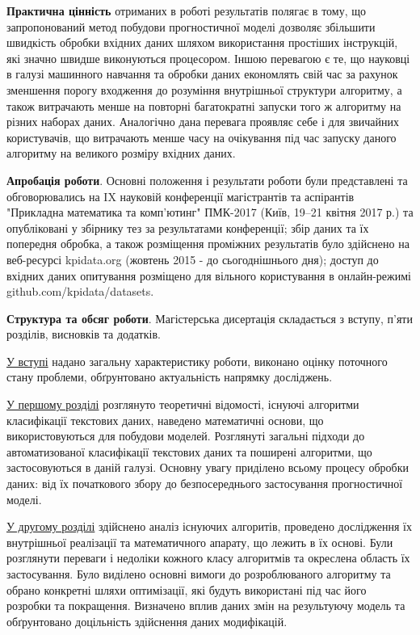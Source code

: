 \documentclass[a4paper,14pt]{extarticle}
\begin{document}
\textbf{Практична цінність} отриманих в роботі результатів полягає в тому,
що запропонований метод побудови прогностичної моделі дозволяє збільшити швидкість обробки вхідних даних шляхом використання простіших інструкцій, які значно швидше виконуються процесором. Іншою перевагою є те, що науковці в галузі машинного навчання та обробки даних економлять свій час за рахунок зменшення порогу входження до розуміння внутрішньої структури алгоритму, а також витрачають менше на повторні багатократні запуски того ж алгоритму на різних наборах даних. Аналогічно дана перевага проявляє себе і для звичайних користувачів, що витрачають менше часу на очікування під час запуску даного алгоритму на великого розміру вхідних даних.

\textbf{Апробація роботи}. Основні положення і результати роботи були представлені та обговорювались на IX науковій конференції магістрантів та аспірантів "Прикладна математика та комп’ютинг" ПМК-2017 (Київ,
19–21 квітня 2017 р.) та опубліковані у збірнику тез за результатами конференції; збір даних та їх попередня обробка, а також розміщення проміжних результатів було здійснено на веб-ресурсі kpidata.org (жовтень 2015 - до сьогоднішнього дня); доступ до вхідних даних опитування розміщено для вільного користування в онлайн-режимі github.com/kpidata/datasets.

\textbf{Структура та обсяг роботи}. Магістерська дисертація складається з вступу, п'яти розділів, висновків та додатків.

\underline{У вступі} надано загальну характеристику роботи, виконано оцінку поточного стану проблеми, обґрунтовано актуальність напрямку досліджень.

\underline{У першому розділі} розглянуто теоретичні відомості, існуючі алгоритми класифікації текстових даних, наведено математичні основи, що використовуються для побудови моделей. Розглянуті загальні підходи до автоматизованої класифікації текстових даних та поширені алгоритми, що застосовуються в даній галузі. Основну увагу приділено всьому процесу обробки даних: від їх початкового збору до безпосереднього застосування прогностичної моделі.

\underline{У другому розділі} здійснено аналіз існуючих алгоритів, проведено дослідження їх внутрішньої реалізації та математичного апарату, що лежить в їх основі. Були розглянути переваги і недоліки кожного класу алгоритмів та окреслена область їх застосування. Було виділено основні вимоги до розроблюваного алгоритму та обрано конкретні шляхи оптимізації, які будуть використані під час його розробки та покращення. Визначено вплив даних змін на результуючу модель та обґрунтовано доцільність здійснення даних модифікацій.
\end{document}
